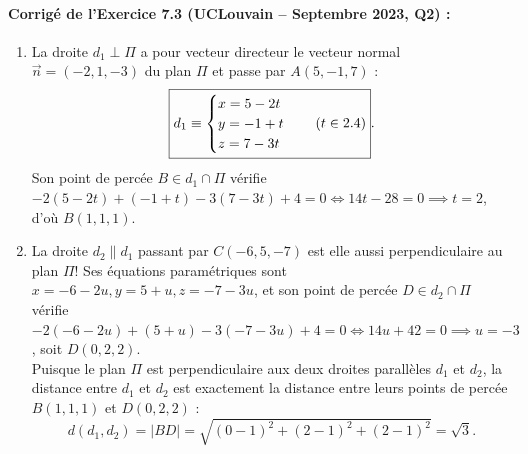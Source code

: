 \paragraph{Corrigé de l'Exercice 7.3 (UCLouvain -- Septembre 2023, Q2) :}
\begin{enumerate}[label=(\alph*)]
    \item La droite $d_1 \perp \Pi$ a pour vecteur directeur le vecteur normal $\vec{n} = (-2, 1, -3)$ du plan $\Pi$ et passe par $A(5, -1, 7)$ :
    \[
        \boxed{d_1 \equiv \begin{cases} x = 5 - 2t \\ y = -1 + t \\ z = 7 - 3t \end{cases} \quad (t \in 2.4)}.
    \]
    Son point de percée $B \in d_1 \cap \Pi$ vérifie $-2(5-2t) + (-1+t) - 3(7-3t) + 4 = 0 \iff 14t - 28 = 0 \implies t = 2$, d'où $\boxed{B(1, 1, 1)}$.
    \item La droite $d_2 \parallel d_1$ passant par $C(-6, 5, -7)$ est elle aussi perpendiculaire au plan $\Pi$! Ses équations paramétriques sont $x = -6-2u, y = 5+u, z = -7-3u$, et son point de percée $D \in d_2 \cap \Pi$ vérifie $-2(-6-2u) + (5+u) - 3(-7-3u) + 4 = 0 \iff 14u + 42 = 0 \implies u = -3$, soit $D(0, 2, 2)$.\\
    Puisque le plan $\Pi$ est perpendiculaire aux deux droites parallèles $d_1$ et $d_2$, la distance entre $d_1$ et $d_2$ est exactement la distance entre leurs points de percée $B(1,1,1)$ et $D(0,2,2)$ :
    \[
        d(d_1, d_2) = |BD| = \sqrt{(0-1)^2 + (2-1)^2 + (2-1)^2} = \boxed{\sqrt{3}}.
    \]
\end{enumerate}


